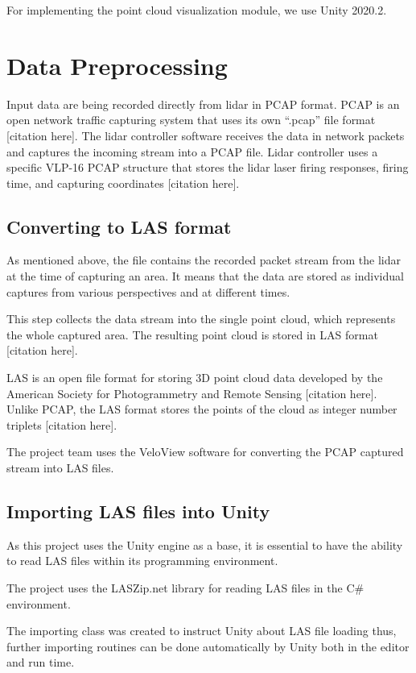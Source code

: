 For implementing the point cloud visualization module, we use Unity 2020.2.


\section{Data Preprocessing}

Input data are being recorded directly from lidar in PCAP format. PCAP is an open network traffic capturing system that uses its own “.pcap” file format [citation here]. The lidar controller software receives the data in network packets and captures the incoming stream into a PCAP file. Lidar controller uses a specific VLP-16 PCAP structure that stores the lidar laser firing responses, firing time, and capturing coordinates [citation here].

\subsection{Converting to LAS format}

As mentioned above, the file contains the recorded packet stream from the lidar at the time of capturing an area. It means that the data are stored as individual captures from various perspectives and at different times.

This step collects the data stream into the single point cloud, which represents the whole captured area. The resulting point cloud is stored in LAS format [citation here].

LAS is an open file format for storing 3D point cloud data developed by the American Society for Photogrammetry and Remote Sensing [citation here]. Unlike PCAP, the LAS format stores the points of the cloud as integer number triplets  [citation here].

The project team uses the VeloView software for converting the PCAP captured stream into LAS files.

\subsection{Importing LAS files into Unity}

As this project uses the Unity engine as a base, it is essential to have the ability to read LAS files within its programming environment. 

The project uses the LASZip.net library for reading LAS files in the C\# environment.

The importing class was created to instruct Unity about LAS file loading thus, further importing routines can be done automatically by Unity both in the editor and run time.


